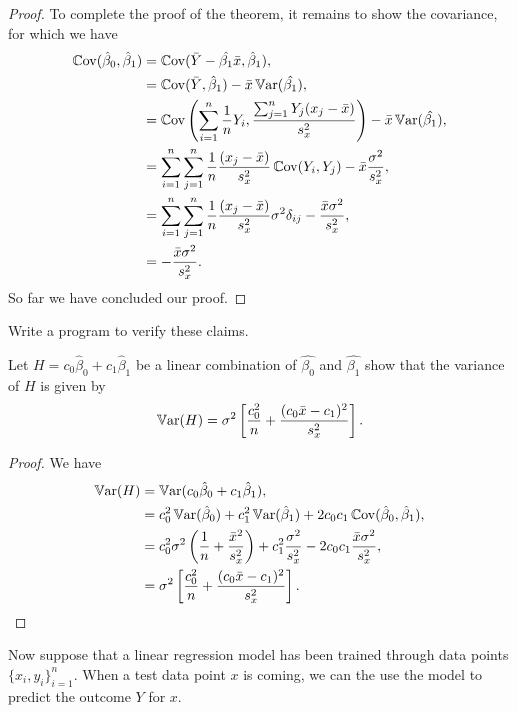\documentclass{book}
\begin{document}
\begin{proof}
To complete the proof of the theorem, it remains to show the covariance, for which we have
\begin{align*}
    \operatorname{\mathbb Cov}(\hat\beta_0,\hat\beta_1) &= \operatorname{\mathbb Cov}(\bar{Y} - \hat{\beta_1}\bar{x},\hat\beta_1),\\
    &= \operatorname{\mathbb Cov}(\bar{Y},\hat\beta_1) - 
    \bar{x} \operatorname{\mathbb Var}(\hat{\beta_1}),\\
    &= \operatorname{\mathbb Cov}
    \left(
    \sum_{i=1}^{n}\frac{1}{n}Y_i, 
    \frac{\sum_{j=1}^n Y_j (x_j - \bar{x})}{s_x^2}
    \right) - 
    \bar{x} \operatorname{\mathbb Var}(\hat{\beta_1}),\\
    &= \sum_{i=1}^n\sum_{j=1}^n\frac{1}{n} \frac{(x_j - \bar{x})}{s_x^2} \operatorname{\mathbb Cov}(Y_i, Y_j) - 
    \bar{x} \frac{\sigma^2}{s_x^2},\\
    &= \sum_{i=1}^n\sum_{j=1}^n\frac{1}{n} \frac{(x_j - \bar{x})}{s_x^2} \sigma^2 \delta_{ij} - 
    \frac{\bar{x} \sigma^2}{s_x^2},\\
    &= - \frac{\bar{x} \sigma^2}{s_x^2}.
\end{align*}
So far we have concluded our proof.
\end{proof}

\problem Write a program to verify these claims.

\problem Let $H = c_0 \hat\beta_0 + c_1 \hat\beta_1$ be a linear combination of $\hat{\beta_0}$ and $\hat{\beta_1}$ show that the variance of $H$ is given by
\begin{align*}
    \operatorname{\mathbb Var}(H) = \sigma^2 \left[ \frac{c_0^2}{n} + \frac{(c_0\bar{x} - c_1)^2}{s_x^2}\right].
\end{align*}
\begin{proof}
We have
\begin{align*}
    \operatorname{\mathbb Var}(H) &= \operatorname{\mathbb Var}(c_0 \hat\beta_0 + c_1 \hat\beta_1),\\
    &= c_0^2 \operatorname{\mathbb Var}(\hat\beta_0)  + c_1^2 \operatorname{\mathbb Var}(\hat\beta_1) + 2c_0c_1 \operatorname{\mathbb Cov}(\hat\beta_0, \hat\beta_1),\\
    &= 
    c_0^2 
    \sigma^2 \left(\frac{1}{n} + \frac{\bar{x}^2}{s_x^2}\right) + c_1^2 
    \frac{\sigma^2}{s_x^2} - 
    2c_0c_1 
    \frac{\bar{x} \sigma^2}{s_x^2},\\
    &= \sigma^2 \left[
    \frac{c_0^2 }{n} + 
    \frac{(c_0\bar{x} - c_1)^2}{s_x^2}
    \right].\\
\end{align*}
\end{proof}

Now suppose that a linear regression model has been trained through data points $\{x_i, y_i\}_{i=1}^n$. When a test data point $x$ is coming, we can the use the model to predict the outcome $Y$ for $x$.
\end{document}
